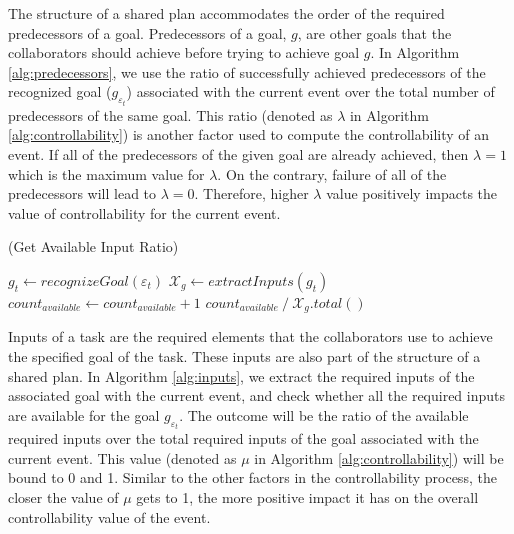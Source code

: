 \documentclass{aamas2016}
\begin{document}
\vspace*{-3mm}
The structure of a shared plan accommodates the order of the required
predecessors of a goal. Predecessors of a goal, $g$, are other goals that
the collaborators should achieve before trying to achieve goal $g$. In Algorithm
\ref{alg:predecessors}, we use the ratio of successfully achieved predecessors
of the recognized goal ($\mathit{g}_{\varepsilon_t}$) associated with the
current event over the total number of predecessors of the same goal. This ratio
(denoted as $\lambda$ in Algorithm \ref{alg:controllability}) is another factor
used to compute the controllability of an event. If all of the predecessors of
the given goal are already achieved, then $\lambda=1$ which is the maximum value
for $\lambda$. On the contrary, failure of all of the predecessors will lead to
$\lambda=0$. Therefore, higher $\lambda$ value positively impacts the value of
controllability for the current event.

\renewcommand\thealgorithm{4\alph{algorithm}}
\setcounter{algorithm}{3}

\begin{algorithm}
	\caption{(Get Available Input Ratio)}
	\label{alg:inputs}
	\begin{algorithmic}[1]
			\Statex
			\State $\mathit{g}_{t} \gets \textit{recognizeGoal}{(\varepsilon_t)}$
			\Statex
			\State $\mathcal{X}_{\mathit{g}} \gets
			\textit{extractInputs}{(\mathit{g}_{t})}$
			\Statex
					\State $count_{available} \gets count_{available} + 1$
				\EndIf
			\EndFor
			\Statex
			\State \Return
			${count_{available} \mathbin{/} \mathcal{X}_{\mathit{g}}.total()}$
		\EndFunction 
	\end{algorithmic}
\end{algorithm}

\vspace*{-3mm}
Inputs of a task are the required elements that the collaborators use to
achieve the specified goal of the task. These inputs are also part of the
structure of a shared plan. In Algorithm \ref{alg:inputs}, we extract the
required inputs of the associated goal with the current event, and check whether
all the required inputs are available for the goal $\mathit{g}_{\varepsilon_t}$.
The outcome will be the ratio of the available required inputs over the total
required inputs of the goal associated with the current event. This value
(denoted as $\mu$ in Algorithm \ref{alg:controllability}) will be bound to 0 and
1. Similar to the other factors in the controllability process, the closer the
value of $\mu$ gets to 1, the more positive impact it has on the overall
controllability value of the event.
\end{document}
